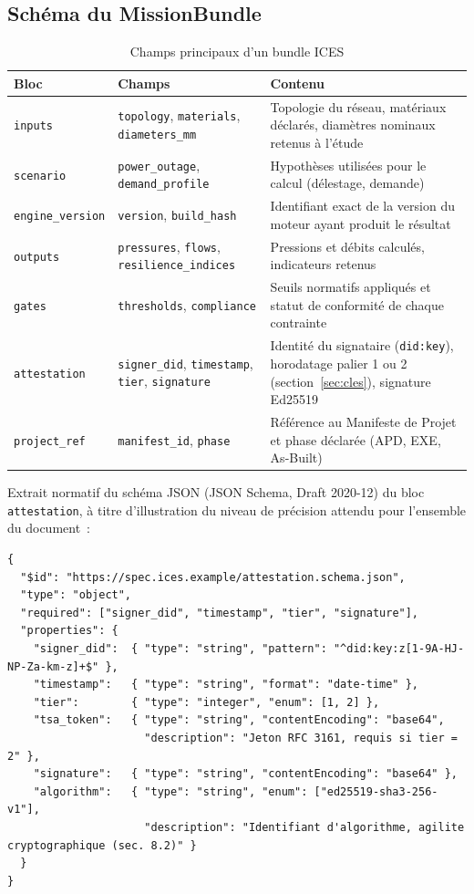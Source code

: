 \documentclass[11pt,a4paper]{article}
\begin{document}
\subsection{Schéma du MissionBundle}\label{sec:spec-schema}

\begin{table}[H]\centering\small
\caption{Champs principaux d'un bundle ICES}
\begin{tabularx}{\linewidth}{@{}p{2.5cm}p{3.2cm}X@{}}
\toprule
\textbf{Bloc} & \textbf{Champs} & \textbf{Contenu} \\
\midrule
\texttt{inputs} & \texttt{topology}, \texttt{materials}, \texttt{diameters\_mm} & Topologie du réseau, matériaux déclarés, diamètres nominaux retenus à l'étude \\
\texttt{scenario} & \texttt{power\_outage}, \texttt{demand\_profile} & Hypothèses utilisées pour le calcul (délestage, demande) \\
\texttt{engine\_version} & \texttt{version}, \texttt{build\_hash} & Identifiant exact de la version du moteur ayant produit le résultat \\
\texttt{outputs} & \texttt{pressures}, \texttt{flows}, \texttt{resilience\_indices} & Pressions et débits calculés, indicateurs retenus \\
\texttt{gates} & \texttt{thresholds}, \texttt{compliance} & Seuils normatifs appliqués et statut de conformité de chaque contrainte \\
\texttt{attestation} & \texttt{signer\_did}, \texttt{timestamp}, \texttt{tier}, \texttt{signature} & Identité du signataire (\texttt{did:key}), horodatage palier 1 ou 2 (section~\ref{sec:cles}), signature Ed25519 \\
\texttt{project\_ref} & \texttt{manifest\_id}, \texttt{phase} & Référence au Manifeste de Projet et phase déclarée (APD, EXE, As-Built) \\
\bottomrule
\end{tabularx}
\end{table}

Extrait normatif du schéma JSON (JSON Schema, Draft 2020-12) du bloc \texttt{attestation}, à titre d'illustration du niveau de précision attendu pour l'ensemble du document~:

\begin{lstlisting}[style=icesjson]
{
  "$id": "https://spec.ices.example/attestation.schema.json",
  "type": "object",
  "required": ["signer_did", "timestamp", "tier", "signature"],
  "properties": {
    "signer_did":  { "type": "string", "pattern": "^did:key:z[1-9A-HJ-NP-Za-km-z]+$" },
    "timestamp":   { "type": "string", "format": "date-time" },
    "tier":        { "type": "integer", "enum": [1, 2] },
    "tsa_token":   { "type": "string", "contentEncoding": "base64",
                     "description": "Jeton RFC 3161, requis si tier = 2" },
    "signature":   { "type": "string", "contentEncoding": "base64" },
    "algorithm":   { "type": "string", "enum": ["ed25519-sha3-256-v1"],
                     "description": "Identifiant d'algorithme, agilite cryptographique (sec. 8.2)" }
  }
}
\end{lstlisting}
\end{document}
